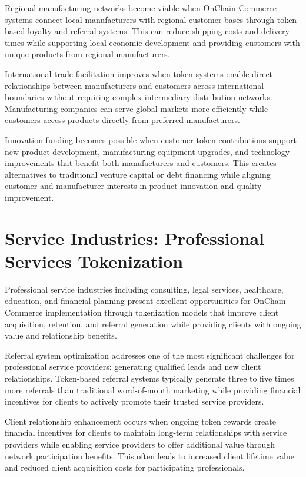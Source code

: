 \documentclass[
  Letterpaper,
]{scrbook}
\begin{document}
Regional manufacturing networks become viable when OnChain Commerce
systems connect local manufacturers with regional customer bases through
token-based loyalty and referral systems. This can reduce shipping costs
and delivery times while supporting local economic development and
providing customers with unique products from regional manufacturers.

International trade facilitation improves when token systems enable
direct relationships between manufacturers and customers across
international boundaries without requiring complex intermediary
distribution networks. Manufacturing companies can serve global markets
more efficiently while customers access products directly from preferred
manufacturers.

Innovation funding becomes possible when customer token contributions
support new product development, manufacturing equipment upgrades, and
technology improvements that benefit both manufacturers and customers.
This creates alternatives to traditional venture capital or debt
financing while aligning customer and manufacturer interests in product
innovation and quality improvement.

\section{Service Industries: Professional Services
Tokenization}\label{service-industries-professional-services-tokenization}

Professional service industries including consulting, legal services,
healthcare, education, and financial planning present excellent
opportunities for OnChain Commerce implementation through tokenization
models that improve client acquisition, retention, and referral
generation while providing clients with ongoing value and relationship
benefits.

Referral system optimization addresses one of the most significant
challenges for professional service providers: generating qualified
leads and new client relationships. Token-based referral systems
typically generate three to five times more referrals than traditional
word-of-mouth marketing while providing financial incentives for clients
to actively promote their trusted service providers.

Client relationship enhancement occurs when ongoing token rewards create
financial incentives for clients to maintain long-term relationships
with service providers while enabling service providers to offer
additional value through network participation benefits. This often
leads to increased client lifetime value and reduced client acquisition
costs for participating professionals.
\end{document}
